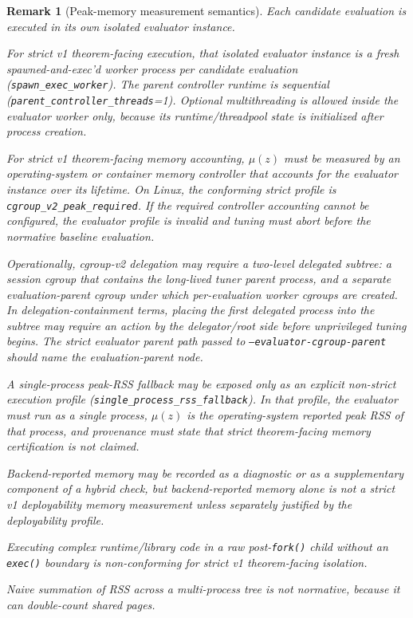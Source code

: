 \documentclass[11pt]{article}
\newtheorem{remark}{Remark}
\begin{document}
\begin{remark}[Peak-memory measurement semantics]
Each candidate evaluation is executed in its own isolated evaluator instance.

For strict v1 theorem-facing execution, that isolated evaluator instance is a
fresh spawned-and-exec'd worker process per candidate evaluation
(\texttt{spawn\_exec\_worker}). The parent controller runtime is sequential
(\texttt{parent\_controller\_threads}=1). Optional multithreading is allowed
inside the evaluator worker only, because its runtime/threadpool state is
initialized after process creation.

For strict v1 theorem-facing memory accounting, $\mu(z)$ must be measured by an
operating-system or container memory controller that accounts for the evaluator
instance over its lifetime. On Linux, the conforming strict profile is
\texttt{cgroup\_v2\_peak\_required}. If the required controller accounting
cannot be configured, the evaluator profile is invalid and tuning must abort
before the normative baseline evaluation.

Operationally, cgroup-v2 delegation may require a two-level delegated subtree:
a session cgroup that contains the long-lived tuner parent process, and a
separate evaluation-parent cgroup under which per-evaluation worker cgroups are
created. In delegation-containment terms, placing the first delegated process
into the subtree may require an action by the delegator/root side before
unprivileged tuning begins. The strict evaluator parent path passed to
\texttt{--evaluator-cgroup-parent} should name the evaluation-parent node.

A single-process peak-RSS fallback may be exposed only as an explicit
non-strict execution profile
(\texttt{single\_process\_rss\_fallback}). In that profile, the evaluator must
run as a single process, $\mu(z)$ is the operating-system reported peak RSS of
that process, and provenance must state that strict theorem-facing memory
certification is not claimed.

Backend-reported memory may be recorded as a diagnostic or as a supplementary
component of a hybrid check, but backend-reported memory alone is not a strict
v1 deployability memory measurement unless separately justified by the
deployability profile.

Executing complex runtime/library code in a raw post-\texttt{fork()} child
without an \texttt{exec()} boundary is non-conforming for strict v1
theorem-facing isolation.

Naive summation of RSS across a multi-process tree is not normative, because it
can double-count shared pages.
\end{remark}
\end{document}
